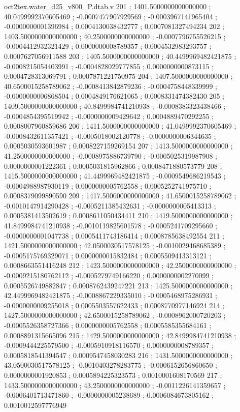 \begin{filecontents}[overwrite]{oct2tex.water_d25_v800_P.dtab.v}
201 ; 1401.5000000000000000 ; 40.0499992370605469 ; -0.0007477907929569 ; -0.0003967141965404 ; -0.0000000001396984 ; 0.0004130038432777 ; 0.0007081327494234
202 ; 1403.5000000000000000 ; 40.2500000000000000 ; -0.0007796755526215 ; -0.0004412932321429 ; 0.0000000008789357 ; 0.0004532983293757 ; 0.0007627056911588
203 ; 1405.5000000000000000 ; 40.4499969482421875 ; -0.0008215054403991 ; -0.0004828029777855 ; 0.0000000000873115 ; 0.0004728313069791 ; 0.0007871221750975
204 ; 1407.5000000000000000 ; 40.6500015258789062 ; -0.0008413842879236 ; -0.0004758448339999 ; -0.0000000006868504 ; 0.0004849176621065 ; 0.0008331474382430
205 ; 1409.5000000000000000 ; 40.8499984741210938 ; -0.0008383323438466 ; -0.0004854395519942 ; -0.0000000009429642 ; 0.0004889470292255 ; 0.0008007960859686
206 ; 1411.5000000000000000 ; 41.0499992370605469 ; -0.0008432611357421 ; -0.0005018002120778 ; -0.0000000006344635 ; 0.0005030593601987 ; 0.0008227159269154
207 ; 1413.5000000000000000 ; 41.2500000000000000 ; -0.0008975886739790 ; -0.0005025319987908 ; 0.0000000001222361 ; 0.0005031815962866 ; 0.0008471880573779
208 ; 1415.5000000000000000 ; 41.4499969482421875 ; -0.0009549686219543 ; -0.0004988987930119 ; 0.0000000005762558 ; 0.0005252741975710 ; 0.0008379099890590
209 ; 1417.5000000000000000 ; 41.6500015258789062 ; -0.0010147914290428 ; -0.0005211385432631 ; -0.0000000005413313 ; 0.0005381413502619 ; 0.0008611050434411
210 ; 1419.5000000000000000 ; 41.8499984741210938 ; -0.0010119825601578 ; -0.0005241709295660 ; -0.0000000001047738 ; 0.0005411743186414 ; 0.0008785638492554
211 ; 1421.5000000000000000 ; 42.0500030517578125 ; -0.0010029468685389 ; -0.0005175769329071 ; 0.0000000015832484 ; 0.0005509413313121 ; 0.0008663551416248
212 ; 1423.5000000000000000 ; 42.2500000000000000 ; -0.0009215180762112 ; -0.0005279749166220 ; 0.0000000002270099 ; 0.0005526749882847 ; 0.0008762439247221
213 ; 1425.5000000000000000 ; 42.4499969482421875 ; -0.0008867229335010 ; -0.0005468975286931 ; -0.0000000009255018 ; 0.0005503557622433 ; 0.0008770977146924
214 ; 1427.5000000000000000 ; 42.6500015258789062 ; -0.0008962000720203 ; -0.0005526358727366 ; 0.0000000005762558 ; 0.0005585355684161 ; 0.0008891315665096
215 ; 1429.5000000000000000 ; 42.8499984741210938 ; -0.0009444225579500 ; -0.0005910918116570 ; 0.0000000008789357 ; 0.0005818541394547 ; 0.0009547458030283
216 ; 1431.5000000000000000 ; 43.0500030517578125 ; -0.0010403278283775 ; -0.0006152656860650 ; 0.0000000001920853 ; 0.0005894225323573 ; 0.0010001608170569
217 ; 1433.5000000000000000 ; 43.2500000000000000 ; -0.0011226141359657 ; -0.0006401713471860 ; -0.0000000005238689 ; 0.0006084673805162 ; 0.0010012597776949

\end{filecontents}
